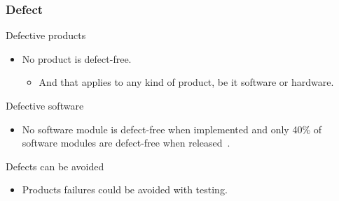 \begin{frame}[parent={cmap:software-testing},hasnext=true,hasprev=true]
\frametitle{Defect}
\label{concept:defect}

\begin{block:fact}{Defective products}
\begin{itemize}
    \item No product is defect-free.
    \begin{itemize}
		\item And that applies to any kind of product, be it software or
		hardware.
    \end{itemize}
\end{itemize}

\hfill
{}
\end{block:fact}


\begin{block:fact}{Defective software}
\begin{itemize}
	\item No software module is defect-free when implemented and only 40\% of
    software modules are defect-free when released~\cite{shull-etal:2002}.
\end{itemize}

\hfill
{}
\end{block:fact}

\begin{block:fact}{Defects can be avoided}
\begin{itemize}
	\item Products failures could be avoided with testing.
\end{itemize}
\end{block:fact}
\end{frame}
